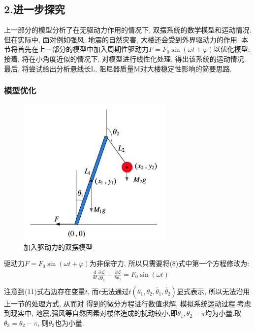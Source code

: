 \documentclass[10.5pt,a4paper]{ctexart}
\begin{document}
\subsection*{2.进一步探究}
上一部分的模型分析了在无驱动力作用的情况下, 双摆系统的数学模型和运动情况. 但在实际中, 面对例如强风, 地震的自然灾害, 大楼还会受到外界驱动力的作用.
本节将首先在上一部分的模型中加入周期性驱动力$F = F_0\sin{\left(\omega t + \varphi \right)}$以优化模型; 接着, 将在小角度近似的情况下, 对模型进行线性化处理,  
得出该系统的运动情况. 最后, 将尝试给出分析悬线长L, 阻尼器质量M对大楼稳定性影响的简要思路.
\subsubsection*{模型优化}
\begin{figure}[htbp]
	\begin{center}
		\includegraphics[width=3in]{figs/plusforce.png}
	\end{center}
	\caption{加入驱动力的双摆模型}
\end{figure}
驱动力$F = F_0\sin{\left(\omega t + \varphi \right)}$为非保守力, 所以只需要将(8)式中第一个方程修改为:\\
\begin{equation}
  \begin{aligned}
  &\frac{\mathrm{d}}{\mathrm{d}t} \frac{\partial{\mathcal{L}}}{\partial{\dot{\theta_1}}} - \frac{\partial{\mathcal{L}}}{\partial{\theta_1}} = F_0\sin{\left(\omega t\right)}\\
  \end{aligned}
\end{equation}
注意到(11)式右边存在变量$t$, 而$t$无法通过$t(\theta_1, \theta_2, \dot{\theta_1}, \dot{\theta_2})$显式表示, 所以无法沿用上一节的处理方式, 从而对
得到的微分方程进行数值求解, 模拟系统运动过程.考虑到现实中, 地震,强风等自然因素对楼体造成的扰动较小,即$\theta_1, \theta_2 - \pi$均为小量.取$\theta_3 = \theta_2 - \pi$, 则$\theta_3$也为小量.
\end{document}
